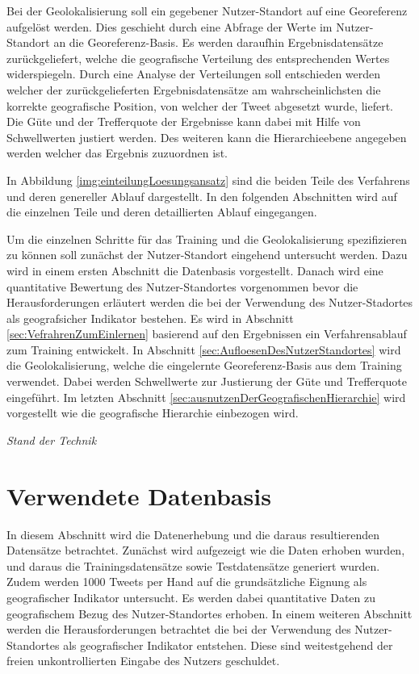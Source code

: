 		Bei der Geolokalisierung soll ein gegebener Nutzer-Standort auf eine Georeferenz aufgelöst werden. 
		Dies geschieht durch eine Abfrage der Werte im Nutzer-Standort an die Georeferenz-Basis.
		Es werden daraufhin Ergebnisdatensätze zurückgeliefert, welche die geografische Verteilung des entsprechenden Wertes widerspiegeln.
		Durch eine Analyse der Verteilungen soll entschieden werden welcher der zurückgelieferten Ergebnisdatensätze am wahrscheinlichsten die korrekte geografische Position, von welcher der Tweet abgesetzt wurde, liefert.
		Die Güte und der Trefferquote der Ergebnisse kann dabei mit Hilfe von Schwellwerten justiert werden.
		Des weiteren kann die Hierarchieebene angegeben werden welcher das Ergebnis zuzuordnen ist.

		In Abbildung \ref{img:einteilungLoesungsansatz} sind die beiden Teile des Verfahrens und deren genereller Ablauf dargestellt.
		In den folgenden Abschnitten wird auf die einzelnen Teile und deren detaillierten Ablauf eingegangen. 
		
		Um die einzelnen Schritte für das Training und die Geolokalisierung spezifizieren zu können soll zunächst der Nutzer-Standort eingehend untersucht werden.
		Dazu wird in einem ersten Abschnitt die Datenbasis vorgestellt.
		Danach wird eine quantitative Bewertung des Nutzer-Standortes vorgenommen bevor die Herausforderungen erläutert werden die bei der Verwendung des Nutzer-Stadortes als geografsicher Indikator bestehen.
		Es wird in Abschnitt \ref{sec:VefrahrenZumEinlernen} basierend auf den Ergebnissen ein Verfahrensablauf zum Training entwickelt. 
		In Abschnitt \ref{sec:AufloesenDesNutzerStandortes} wird die Geolokalisierung, welche die eingelernte Georeferenz-Basis aus dem Training verwendet.
		Dabei werden Schwellwerte zur Justierung der Güte und Trefferquote eingeführt.
		Im letzten Abschnitt \ref{sec:ausnutzenDerGeografischenHierarchie} wird vorgestellt wie die geografische Hierarchie einbezogen wird.

		\textit{Stand der Technik} 

	\section{Verwendete Datenbasis}

		In diesem Abschnitt wird die Datenerhebung und die daraus resultierenden Datensätze betrachtet.
		Zunächst wird aufgezeigt wie die Daten erhoben wurden, und daraus die Trainingsdatensätze sowie Testdatensätze generiert wurden.
		Zudem werden 1000 Tweets per Hand auf die grundsätzliche Eignung als geografischer Indikator untersucht.
		Es werden dabei quantitative Daten zu geografischem Bezug des Nutzer-Standortes erhoben.
		In einem weiteren Abschnitt werden die Herausforderungen betrachtet die bei der Verwendung des Nutzer-Standortes als geografischer Indikator entstehen. 
		Diese sind weitestgehend der freien unkontrollierten Eingabe des Nutzers geschuldet.

